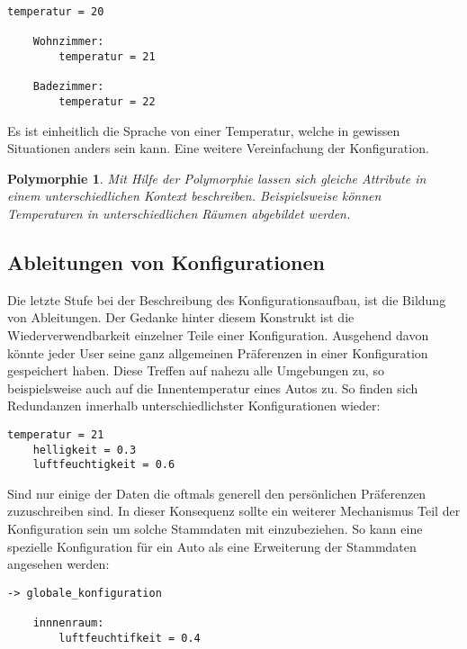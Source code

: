 \lstset{language=bash}
\begin{lstlisting}[caption=Beispiel einer Polymporphie basierten Konfiguration, captionpos=b]
  temperatur = 20
	
	Wohnzimmer: 
		temperatur = 21
	
	Badezimmer: 
		temperatur = 22

\end{lstlisting}

Es ist einheitlich die Sprache von einer Temperatur, welche in gewissen Situationen anders sein kann. Eine weitere Vereinfachung der Konfiguration.

\newtheorem{mydef}{Polymorphie}
\begin{mydef}
Mit Hilfe der Polymorphie lassen sich gleiche Attribute in einem unterschiedlichen Kontext beschreiben. Beispielsweise können Temperaturen in unterschiedlichen Räumen abgebildet werden.
\end{mydef}

\subsection{Ableitungen von Konfigurationen}
Die letzte Stufe bei der Beschreibung des Konfigurationsaufbau, ist die Bildung von Ableitungen. Der Gedanke hinter diesem Konstrukt ist die Wiederverwendbarkeit einzelner Teile einer Konfiguration. Ausgehend davon könnte jeder User seine ganz allgemeinen Präferenzen in einer Konfiguration gespeichert haben. Diese Treffen auf nahezu alle Umgebungen zu, so beispielsweise auch auf die Innentemperatur eines Autos zu. So finden sich Redundanzen innerhalb unterschiedlichster Konfigurationen wieder:
\lstset{language=bash}
\begin{lstlisting}[caption=Globale Attribute einer Konfiguration, captionpos=b]
	temperatur = 21
	helligkeit = 0.3
	luftfeuchtigkeit = 0.6

\end{lstlisting}

Sind nur einige der Daten die oftmals generell den persönlichen Präferenzen zuzuschreiben sind. In dieser Konsequenz sollte ein weiterer Mechanismus Teil der Konfiguration sein um solche Stammdaten mit einzubeziehen. So kann eine spezielle Konfiguration für ein Auto als eine Erweiterung der Stammdaten angesehen werden:
\lstset{language=bash}
\begin{lstlisting}[caption=Ableitung der Globalkonfiguration, captionpos=b]
	-> globale_konfiguration
	
	innnenraum:
		luftfeuchtifkeit = 0.4

\end{lstlisting}

